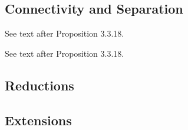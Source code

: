 \begin{definition}[$M(K_{5})$]
  \label{def:M_K_5}
\end{definition}

\begin{definition}[$M(K_{5})^{*}$]
  \label{def:M_K_5_dual}
\end{definition}


\subsection{Connectivity and Separation}

\begin{definition}[$k$-separation]
  \label{def:k_sep}
  See text after Proposition 3.3.18.
\end{definition}

\begin{definition}[$k$-connectivity]
  \label{def:k_conn}
  See text after Proposition 3.3.18.
\end{definition}


\subsection{Reductions}

\begin{definition}[deletion]
  \label{def:deletion}
\end{definition}

\begin{definition}[contraction]
  \label{def:contraction}
\end{definition}


\begin{definition}[minor]
  \label{def:minor}
\end{definition}


\subsection{Extensions}



